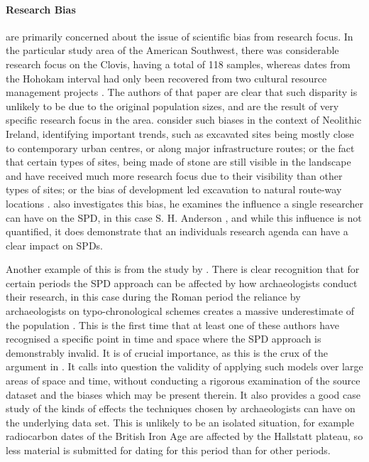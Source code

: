 \paragraph{Research Bias}
\citet{BALLENGER20111314} are primarily concerned about the issue of scientific bias from research focus. In the particular study area of the American Southwest, there was considerable research focus on the Clovis, having a total of 118 samples, whereas dates from the Hohokam interval had only been recovered from two cultural resource management projects \citep[131]{BALLENGER20111314}. The authors of that paper are clear that such disparity is unlikely to be due to the original population sizes, and are the result of very specific research focus in the area. \citet{McLaughlin2016} consider such biases in the context of Neolithic Ireland, identifying important trends, such as excavated sites being mostly close to contemporary urban centres, or along major infrastructure routes; or the fact that certain types of sites, being made of stone are still visible in the landscape and have received much more research focus due to their visibility than other types of sites; or the bias of development led excavation to natural route-way locations \citep[139]{McLaughlin2016}. \citet{Torfing2015193} also investigates this bias, he examines the influence a single researcher can have on the SPD, in this case S. H. Anderson \citep[196]{Torfing2015193}, and while this influence is not quantified, \citep[200]{Timpson2015199} it does demonstrate that an individuals research agenda can have a clear impact on SPDs. 

Another example of this is from the study by \citet{PALMISANO201759}. There is clear recognition that for certain periods the SPD approach can be affected by how archaeologists conduct their research, in this case during the Roman period the reliance by archaeologists on typo-chronological schemes creates a massive underestimate of the population \citep[66]{PALMISANO201759}. This is the first time that at least one of these authors have recognised a specific point in time and space where the SPD approach is demonstrably invalid. It is of crucial importance, as this is the crux of the argument in \citet{Torfing2015193}. It calls into question the validity of applying such models over large areas of space and time, without conducting a rigorous examination of the source dataset and the biases which may be present therein. It also provides a good case study of the kinds of effects the techniques chosen by archaeologists can have on the underlying data set. This is unlikely to be an isolated situation, for example radiocarbon dates of the British Iron Age are affected by the Hallstatt plateau, so less material is submitted for dating for this period than for other periods.

